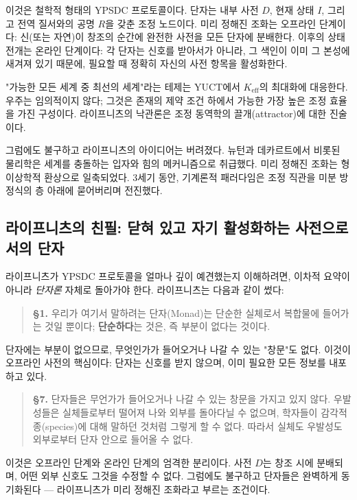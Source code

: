 \documentclass[12pt,a4paper]{article}
\begin{document}
	이것은 철학적 형태의 YPSDC 프로토콜이다. 단자는 내부 사전 \(D\), 현재 상태 \(I\), 그리고 전역 질서와의 공명 \(R\)을 갖춘 조정 노드이다. 미리 정해진 조화는 오프라인 단계이다: 신(또는 자연)이 창조의 순간에 완전한 사전을 모든 단자에 분배한다. 이후의 상태 전개는 온라인 단계이다: 각 단자는 신호를 받아서가 아니라, 그 색인이 이미 그 본성에 새겨져 있기 때문에, 필요할 때 정확히 자신의 사전 항목을 활성화한다.
	
	"가능한 모든 세계 중 최선의 세계"라는 테제는 YUCT에서 \(K_{\mathrm{eff}}\)의 최대화에 대응한다. 우주는 임의적이지 않다; 그것은 존재의 제약 조건 하에서 가능한 가장 높은 조정 효율을 가진 구성이다. 라이프니츠의 낙관론은 조정 동역학의 끌개(attractor)에 대한 진술이다.
	
	그럼에도 불구하고 라이프니츠의 아이디어는 버려졌다. 뉴턴과 데카르트에서 비롯된 물리학은 세계를 충돌하는 입자와 힘의 메커니즘으로 취급했다. 미리 정해진 조화는 형이상학적 환상으로 일축되었다. 3세기 동안, 기계론적 패러다임은 조정 직관을 미분 방정식의 층 아래에 묻어버리며 전진했다.
	
	\subsection{라이프니츠의 친필: 닫혀 있고 자기 활성화하는 사전으로서의 단자}
	
	라이프니츠가 YPSDC 프로토콜을 얼마나 깊이 예견했는지 이해하려면, 이차적 요약이 아니라 \emph{단자론} 자체로 돌아가야 한다. 라이프니츠는 다음과 같이 썼다:
	
	\begin{quote}
		\textbf{§1.} 우리가 여기서 말하려는 단자(Monad)는 단순한 실체로서 복합물에 들어가는 것일 뿐이다; \textbf{단순하다}는 것은, 즉 부분이 없다는 것이다.
	\end{quote}
	
	단자에는 부분이 없으므로, 무엇인가가 들어오거나 나갈 수 있는 "창문"도 없다. 이것이 오프라인 사전의 핵심이다: 단자는 신호를 받지 않으며, 이미 필요한 모든 정보를 내포하고 있다.
	
	\begin{quote}
		\textbf{§7.} 단자들은 무언가가 들어오거나 나갈 수 있는 창문을 가지고 있지 않다. 우발성들은 실체들로부터 떨어져 나와 외부를 돌아다닐 수 없으며, 학자들이 감각적 종(species)에 대해 말하던 것처럼 그렇게 할 수 없다. 따라서 실체도 우발성도 외부로부터 단자 안으로 들어올 수 없다.
	\end{quote}
	
	이것은 오프라인 단계와 온라인 단계의 엄격한 분리이다. 사전 \(D\)는 창조 시에 분배되며, 어떤 외부 신호도 그것을 수정할 수 없다. 그럼에도 불구하고 단자들은 완벽하게 동기화된다 — 라이프니츠가 미리 정해진 조화라고 부르는 조건이다.
	
\end{document}

